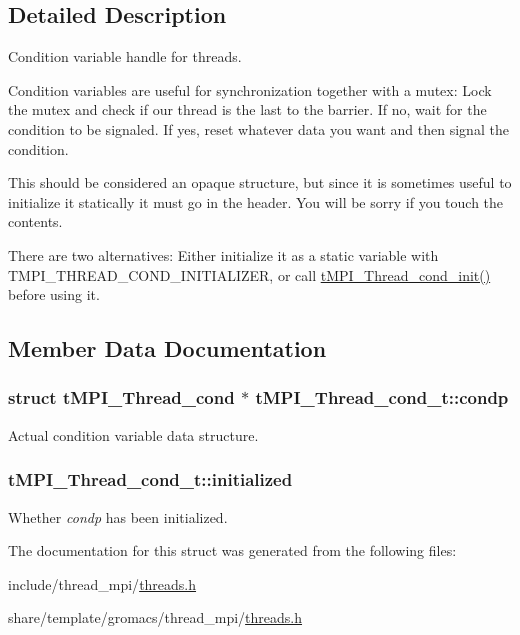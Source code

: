 \subsection{\-Detailed \-Description}
\-Condition variable handle for threads. 

\-Condition variables are useful for synchronization together with a mutex\-: \-Lock the mutex and check if our thread is the last to the barrier. \-If no, wait for the condition to be signaled. \-If yes, reset whatever data you want and then signal the condition.

\-This should be considered an opaque structure, but since it is sometimes useful to initialize it statically it must go in the header. \-You will be sorry if you touch the contents.

\-There are two alternatives\-: \-Either initialize it as a static variable with \-T\-M\-P\-I\-\_\-\-T\-H\-R\-E\-A\-D\-\_\-\-C\-O\-N\-D\-\_\-\-I\-N\-I\-T\-I\-A\-L\-I\-Z\-E\-R, or call \hyperlink{include_2thread__mpi_2threads_8h_a1d4f61219b87650f61d09af0082dd10c}{t\-M\-P\-I\-\_\-\-Thread\-\_\-cond\-\_\-init()} before using it. 

\subsection{\-Member \-Data \-Documentation}
\hypertarget{structtMPI__Thread__cond__t_aadcbad165d1f14e7325147ea4b8a2c0c}{
\subsubsection[{condp}]{\setlength{\rightskip}{0pt plus 5cm}struct {\bf t\-M\-P\-I\-\_\-\-Thread\-\_\-cond} $\ast$ {\bf t\-M\-P\-I\-\_\-\-Thread\-\_\-cond\-\_\-t\-::condp}}}\label{structtMPI__Thread__cond__t_aadcbad165d1f14e7325147ea4b8a2c0c}
\-Actual condition variable data structure. \hypertarget{structtMPI__Thread__cond__t_a157a99c38d7481b3c9faab9aaf7c38e8}{
\subsubsection[{initialized}]{ {\bf t\-M\-P\-I\-\_\-\-Thread\-\_\-cond\-\_\-t\-::initialized}}}\label{structtMPI__Thread__cond__t_a157a99c38d7481b3c9faab9aaf7c38e8}
\-Whether {\itshape condp\/} has been initialized. 

\-The documentation for this struct was generated from the following files\-:\begin{DoxyCompactItemize}
\item 
include/thread\-\_\-mpi/\hyperlink{include_2thread__mpi_2threads_8h}{threads.\-h}\item 
share/template/gromacs/thread\-\_\-mpi/\hyperlink{share_2template_2gromacs_2thread__mpi_2threads_8h}{threads.\-h}\end{DoxyCompactItemize}
